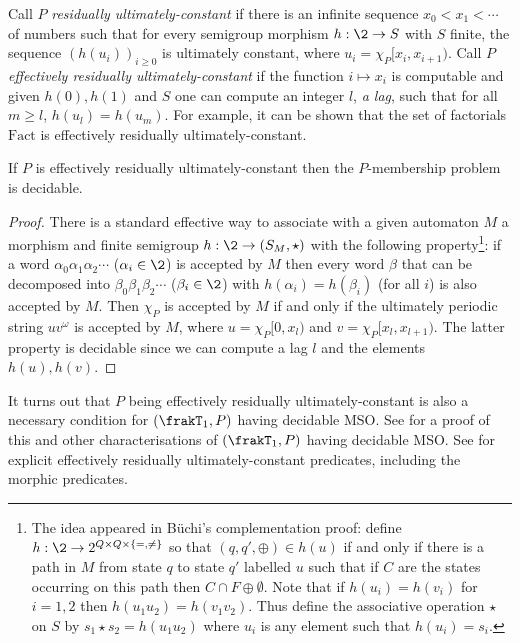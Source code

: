 Call $P$  {\em residually ultimately-constant} if there is an infinite sequence $x_0 < x_1 < \cdots$ of numbers such that
for every semigroup morphism $h:\2 \to S$ with $S$ finite, the sequence $(h(u_i))_{i \geq 0}$ is ultimately constant,
where $u_i = \chi_P[x_i,x_{i+1})$.
Call $P$ {\em effectively residually ultimately-constant} if the function $i \mapsto x_i$ is computable and given $h(0),h(1)$ and $S$ one can compute an integer $l$, {\em a lag}, such that for all $m \geq l$, $h(u_l) = h(u_m)$. For example, it can be shown that the set of factorials $\textrm{Fact}$ is effectively residually ultimately-constant.

\begin{proposition} \cite{CaTo02}
If $P$ is effectively residually ultimately-constant then the $P$-membership problem is decidable.
\end{proposition}

\begin{proof}
There is a standard effective way to associate with a given automaton $M$ a morphism and finite semigroup $h:\2 \to (S_M,\star)$ with the following property\footnote{The idea appeared in B\"uchi's complementation proof: define $h:\2 \to 2^{Q \times Q \times \{=,\neq\}}$ so that $(q,q',\oplus) \in h(u)$ if
and only if there is a path in $M$ from state $q$ to state $q'$ labelled $u$ such that if $C$ are the states occurring on this path then $C \cap F \oplus \emptyset $. Note that if $h(u_i) = h(v_i)$ for $i = 1,2$ then $h(u_1u_2) = h(v_1v_2)$. Thus define the associative operation $\star$ on $S$ by
$s_1 \star  s_2 = h(u_1u_2)$ where $u_i$ is any element such that $h(u_i) = s_i$.
}: if a word $\alpha_0\alpha_1\alpha_2\cdots$ ($\alpha_i \in \2$) is accepted by $M$
then every word $\beta$ that can be decomposed into $\beta_0\beta_1\beta_2\cdots$ ($\beta_i \in \2$) with $h(\alpha_i)=h(\beta_i)$ (for all $i$) is also accepted by $M$.
Then $\chi_P$ is accepted by $M$ if and only if
the ultimately periodic string $uv^\omega$ is accepted by $M$, where $u = \chi_P[0,x_l)$ and $v = \chi_P[x_l,x_{l+1})$. The latter property is decidable since we can compute a lag $l$ and the elements $h(u),h(v)$.
\end{proof}

It turns out that $P$ being effectively residually ultimately-constant is also a necessary condition for $(\frakT_1,P)$ having decidable MSO. See \cite{RaTh06, rabinovich07} for a proof of this and other characterisations of $(\frakT_1,P)$ having decidable MSO. See \cite{CaTo02,Bara07} for explicit effectively residually ultimately-constant predicates, including the morphic predicates.


